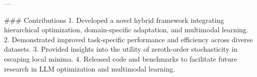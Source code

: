 ---

### Contributions
1. Developed a novel hybrid framework integrating hierarchical optimization, domain-specific adaptation, and multimodal learning.
2. Demonstrated improved task-specific performance and efficiency across diverse datasets.
3. Provided insights into the utility of zeroth-order stochasticity in escaping local minima.
4. Released code and benchmarks to facilitate future research in LLM optimization and multimodal learning.